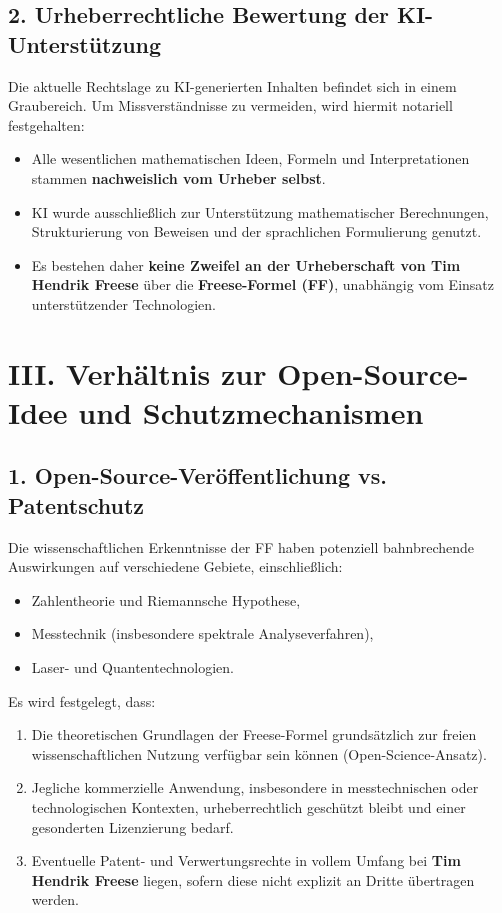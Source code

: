 \documentclass[a4paper,12pt]{article}
\begin{document}
\subsection*{2. Urheberrechtliche Bewertung der KI-Unterstützung}
Die aktuelle Rechtslage zu KI-generierten Inhalten befindet sich in einem Graubereich. Um Missverständnisse zu vermeiden, wird hiermit notariell festgehalten:

\begin{itemize}
    \item Alle wesentlichen mathematischen Ideen, Formeln und Interpretationen stammen \textbf{nachweislich vom Urheber selbst}.
    \item KI wurde ausschließlich zur Unterstützung mathematischer Berechnungen, Strukturierung von Beweisen und der sprachlichen Formulierung genutzt.
    \item Es bestehen daher \textbf{keine Zweifel an der Urheberschaft von Tim Hendrik Freese} über die \textbf{Freese-Formel (FF)}, unabhängig vom Einsatz unterstützender Technologien.
\end{itemize}

\section*{III. Verhältnis zur Open-Source-Idee und Schutzmechanismen}
\subsection*{1. Open-Source-Veröffentlichung vs. Patentschutz}
Die wissenschaftlichen Erkenntnisse der FF haben potenziell bahnbrechende Auswirkungen auf verschiedene Gebiete, einschließlich:

\begin{itemize}
    \item Zahlentheorie und Riemannsche Hypothese,
    \item Messtechnik (insbesondere spektrale Analyseverfahren),
    \item Laser- und Quantentechnologien.
\end{itemize}

Es wird festgelegt, dass:
\begin{enumerate}
    \item Die theoretischen Grundlagen der Freese-Formel grundsätzlich zur freien wissenschaftlichen Nutzung verfügbar sein können (Open-Science-Ansatz).
    \item Jegliche kommerzielle Anwendung, insbesondere in messtechnischen oder technologischen Kontexten, urheberrechtlich geschützt bleibt und einer gesonderten Lizenzierung bedarf.
    \item Eventuelle Patent- und Verwertungsrechte in vollem Umfang bei \textbf{Tim Hendrik Freese} liegen, sofern diese nicht explizit an Dritte übertragen werden.
\end{enumerate}
\end{document}
